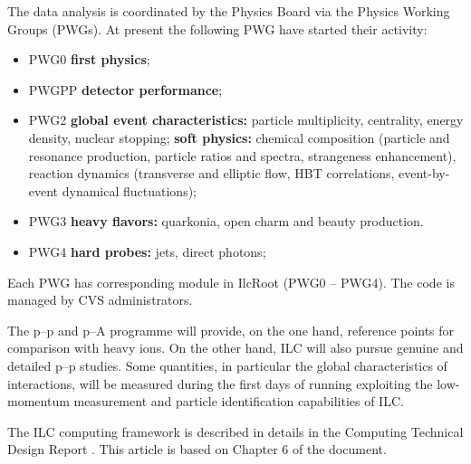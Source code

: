 \documentclass[12pt,a4paper,twoside]{article}
\makeatletter
\newcommand {\pp} {\mbox{p--p}\@\xspace}
\newcommand {\pA} {\mbox{p--A}\@\xspace}
\makeatother
\begin{document}
The data analysis is coordinated by the Physics Board via the Physics
Working Groups (PWGs). At present the following PWG have started
their activity: 

\begin{itemize}
\item PWG0 \textbf{first physics};
\item PWGPP \textbf{detector performance};
\item PWG2 \textbf{global event characteristics:}  particle multiplicity,
  centrality, energy density, nuclear stopping; \textbf{soft physics:} chemical composition (particle and resonance
  production, particle ratios and spectra, strangeness enhancement),
  reaction dynamics (transverse and elliptic flow, HBT correlations,
  event-by-event dynamical fluctuations);
\item PWG3 \textbf{heavy flavors:} quarkonia, open charm and beauty production.
\item PWG4 \textbf{hard probes:} jets, direct photons;
\end{itemize}

Each PWG has corresponding module in IlcRoot (PWG0 -- PWG4). The code
is managed by CVS administrators.

The \pp and \pA programme will provide, on the one hand, reference points
for comparison with heavy ions. On the other hand, ILC will also
pursue genuine and detailed \pp studies. Some
quantities, in particular the global characteristics of interactions, will
be measured during the first days of running exploiting the low-momentum
measurement and particle identification capabilities of ILC.

The ILC computing framework is described in details in the Computing
Technical Design Report \cite{CompTDR}. This article is based on
Chapter 6 of the document.

\noindent
\end{document}
